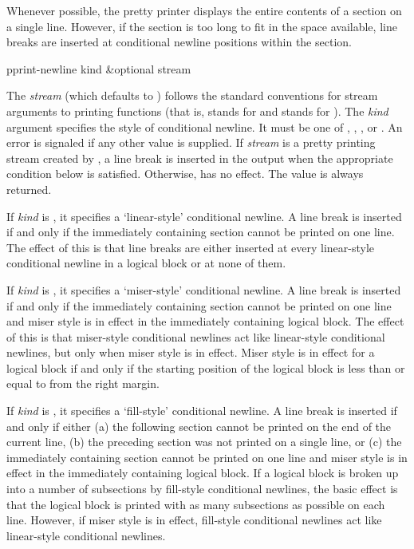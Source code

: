 Whenever possible, the pretty printer displays the entire contents of a
section on a single line.  However, if the section is too long to fit in
the space available, line breaks are inserted at conditional newline
positions within the section.

\begin{defun}[Function]
pprint-newline kind &optional stream 

The {\it stream} (which defaults to ) follows the
standard conventions for stream arguments to printing functions (that is,
 stands for  and  stands for
).  The {\it kind} argument specifies the style of
conditional newline.  It must be one of , ,
, or .  An error is signaled if any other value is
supplied.  If {\it stream} is a pretty printing stream created by
, a line break is inserted in the output when the
appropriate condition below is satisfied.  Otherwise, 
has no effect.  The value  is always returned.

If {\it kind} is , it specifies a `linear-style' conditional newline.
 A line break is inserted if and only if the immediately containing section
cannot be printed on one line.  The effect of this is that line breaks are
either inserted at every linear-style conditional newline in a logical
block or at none of them.

If {\it kind} is , it specifies a `miser-style' conditional newline. 
A line break is inserted if and only if the immediately containing section
cannot be printed on one line and miser style is in effect in the
immediately containing logical block.  The effect of this is that
miser-style conditional newlines act like linear-style conditional
newlines, but only when miser style is in effect.  Miser style is in effect
for a logical block if and only if the starting position of the logical
block is less than or equal to  from the right margin.

If {\it kind} is , it specifies a `fill-style' conditional
newline.  A line break is inserted if and only if either (a) the following
section cannot be printed on the end of the current line, (b) the preceding
section was not printed on a single line, or (c) the immediately containing
section cannot be printed on one line and miser style is in effect in the
immediately containing logical block.  If a logical block is broken up into
a number of subsections by fill-style conditional newlines, the basic
effect is that the logical block is printed with as many subsections as
possible on each line.  However, if miser style is in effect, fill-style
conditional newlines act like linear-style conditional newlines.


\end{defun}
